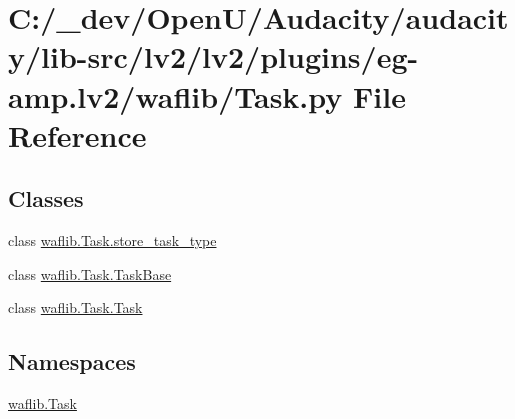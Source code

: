 \hypertarget{lv2_2plugins_2eg-amp_8lv2_2waflib_2_task_8py}{}\section{C\+:/\+\_\+dev/\+Open\+U/\+Audacity/audacity/lib-\/src/lv2/lv2/plugins/eg-\/amp.lv2/waflib/\+Task.py File Reference}
\label{lv2_2plugins_2eg-amp_8lv2_2waflib_2_task_8py}
\subsection*{Classes}
\begin{DoxyCompactItemize}
\item 
class \hyperlink{classwaflib_1_1_task_1_1store__task__type}{waflib.\+Task.\+store\+\_\+task\+\_\+type}
\item 
class \hyperlink{classwaflib_1_1_task_1_1_task_base}{waflib.\+Task.\+Task\+Base}
\item 
class \hyperlink{classwaflib_1_1_task_1_1_task}{waflib.\+Task.\+Task}
\end{DoxyCompactItemize}
\subsection*{Namespaces}
\begin{DoxyCompactItemize}
\item 
 \hyperlink{namespacewaflib_1_1_task}{waflib.\+Task}
\end{DoxyCompactItemize}
